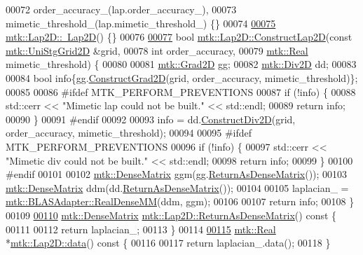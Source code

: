 \begin{DoxyCode}
00072   order\_accuracy\_(lap.order\_accuracy\_),
00073   mimetic\_threshold\_(lap.mimetic\_threshold\_) \{\}
00074 
\hypertarget{mtk__lap__2d_8cc_source_l00075}{}\hyperlink{classmtk_1_1Lap2D_a8ca8447a4da7a5ddcf826486992374a5}{00075} \hyperlink{classmtk_1_1Lap2D_a8ca8447a4da7a5ddcf826486992374a5}{mtk::Lap2D::~Lap2D}() \{\}
00076 
\hypertarget{mtk__lap__2d_8cc_source_l00077}{}\hyperlink{classmtk_1_1Lap2D_a188ee8fee643463affca7de2884711b1}{00077} \textcolor{keywordtype}{bool} \hyperlink{classmtk_1_1Lap2D_a188ee8fee643463affca7de2884711b1}{mtk::Lap2D::ConstructLap2D}(\textcolor{keyword}{const} 
      \hyperlink{classmtk_1_1UniStgGrid2D}{mtk::UniStgGrid2D} &grid,
00078                                 \textcolor{keywordtype}{int} order\_accuracy,
00079                                 \hyperlink{group__c01-roots_gac080bbbf5cbb5502c9f00405f894857d}{mtk::Real} mimetic\_threshold) \{
00080 
00081   \hyperlink{classmtk_1_1Grad2D}{mtk::Grad2D} gg;
00082   \hyperlink{classmtk_1_1Div2D}{mtk::Div2D} dd;
00083 
00084   \textcolor{keywordtype}{bool} info\{gg.\hyperlink{classmtk_1_1Grad2D_a9771be954c59880e3d83f4d645378c00}{ConstructGrad2D}(grid, order\_accuracy, mimetic\_threshold)\};
00085 
00086 \textcolor{preprocessor}{  #ifdef MTK\_PERFORM\_PREVENTIONS}
00087   \textcolor{keywordflow}{if} (!info) \{
00088     std::cerr << \textcolor{stringliteral}{"Mimetic lap could not be built."} << std::endl;
00089     \textcolor{keywordflow}{return} info;
00090   \}
00091 \textcolor{preprocessor}{  #endif}
00092 
00093   info = dd.\hyperlink{classmtk_1_1Div2D_a4214055909a6b94fcb9d657cc839055f}{ConstructDiv2D}(grid, order\_accuracy, mimetic\_threshold);
00094 
00095 \textcolor{preprocessor}{  #ifdef MTK\_PERFORM\_PREVENTIONS}
00096   \textcolor{keywordflow}{if} (!info) \{
00097     std::cerr << \textcolor{stringliteral}{"Mimetic div could not be built."} << std::endl;
00098     \textcolor{keywordflow}{return} info;
00099   \}
00100 \textcolor{preprocessor}{  #endif}
00101 
00102   \hyperlink{classmtk_1_1DenseMatrix}{mtk::DenseMatrix} ggm(gg.\hyperlink{classmtk_1_1Grad2D_a4f5a17519455f833bb70b8434c272312}{ReturnAsDenseMatrix}());
00103   \hyperlink{classmtk_1_1DenseMatrix}{mtk::DenseMatrix} ddm(dd.\hyperlink{classmtk_1_1Div2D_ae4f880fb28ad2379906e9ac0dfaa4458}{ReturnAsDenseMatrix}());
00104 
00105   laplacian\_ = \hyperlink{classmtk_1_1BLASAdapter_acebd0e9bfe0bdd609c7fbea98ccfd3b5}{mtk::BLASAdapter::RealDenseMM}(ddm, ggm);
00106 
00107   \textcolor{keywordflow}{return} info;
00108 \}
00109 
\hypertarget{mtk__lap__2d_8cc_source_l00110}{}\hyperlink{classmtk_1_1Lap2D_aaac0a22eaa2f036869b24fd420ce5761}{00110} \hyperlink{classmtk_1_1DenseMatrix}{mtk::DenseMatrix} \hyperlink{classmtk_1_1Lap2D_aaac0a22eaa2f036869b24fd420ce5761}{mtk::Lap2D::ReturnAsDenseMatrix}()\textcolor{keyword}{ const }\{
00111 
00112   \textcolor{keywordflow}{return} laplacian\_;
00113 \}
00114 
\hypertarget{mtk__lap__2d_8cc_source_l00115}{}\hyperlink{classmtk_1_1Lap2D_a102427355df09c2aad400c6ce18e5636}{00115} \hyperlink{group__c01-roots_gac080bbbf5cbb5502c9f00405f894857d}{mtk::Real} *\hyperlink{classmtk_1_1Lap2D_a102427355df09c2aad400c6ce18e5636}{mtk::Lap2D::data}()\textcolor{keyword}{ const }\{
00116 
00117   \textcolor{keywordflow}{return} laplacian\_.data();
00118 \}
\end{DoxyCode}

